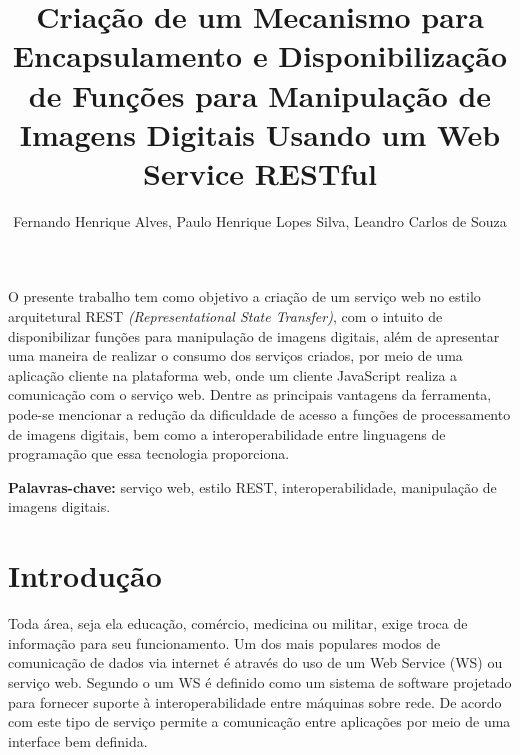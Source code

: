 \documentclass[12pt]{article}
\title{Criação de um Mecanismo para Encapsulamento e Disponibilização de Funções para Manipulação de Imagens Digitais Usando um Web Service RESTful}
\author{Fernando Henrique Alves\inst{1}, Paulo Henrique Lopes Silva\inst{1}, Leandro Carlos de Souza\inst{1}}
\begin{document}
 
\pagestyle{plain}
\maketitle


\begin{resumo} 
  O presente trabalho tem como objetivo a criação de um serviço web no estilo arquitetural REST \textit{(Representational State Transfer)}, com o intuito de disponibilizar funções para manipulação de imagens digitais, além de apresentar uma maneira de realizar o consumo dos serviços criados, por meio de uma aplicação cliente na plataforma web, onde um cliente JavaScript realiza a comunicação com o serviço web. Dentre as principais vantagens da ferramenta, pode-se mencionar a redução da dificuldade de acesso a funções de processamento de imagens digitais, bem como a interoperabilidade entre linguagens de programação que essa tecnologia proporciona.
  
\end{resumo}
\textbf{Palavras-chave:} serviço web, estilo REST, interoperabilidade, manipulação de imagens digitais.

\section{Introdução}


Toda área, seja ela educação, comércio, medicina ou militar, exige troca de informação para seu funcionamento. 
Um dos mais populares modos de comunicação de dados via internet é através do uso de um Web Service (WS) ou serviço web.
Segundo o \cite{w3c1} um WS é definido como um sistema de software projetado para fornecer suporte à interoperabilidade entre máquinas sobre rede.
De acordo com  \cite{cerami:02} este tipo
de serviço permite a comunicação entre aplicações por meio de uma interface bem
definida.
\end{document}
